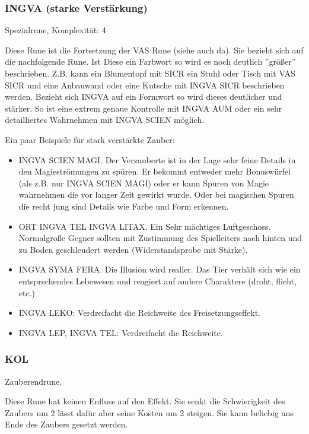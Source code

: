 \documentclass{article}
\begin{document}
\subsubsection{INGVA (starke Verstärkung)}

Spezialrune, Komplexität: 4

Diese Rune ist die Fortsetzung der VAS Rune (siehe auch da). Sie bezieht sich auf die nachfolgende Rune. Ist Diese
ein Farbwort so wird es noch deutlich ''größer'' beschrieben. Z.B. kann ein Blumentopf mit SICR ein Stuhl oder Tisch
mit VAS SICR und eine Anbauwand oder eine Kutsche mit INGVA SICR beschrieben werden. Bezieht sich INGVA auf ein
Formwort so wird dieses deutlicher und stärker. So ist eine extrem genaue Kontrolle mit INGVA AUM oder ein sehr
detailliertes Wahrnehmen mit INGVA SCIEN möglich.

Ein paar Beispiele für stark verstärkte Zauber:

\begin{itemize}
\item INGVA SCIEN MAGI. Der Verzauberte ist in der Lage sehr feine Details in den Magieströmungen zu spüren. Er bekommt entweder mehr Bonuswürfel (als z.B. nur INGVA SCIEN MAGI) oder er kann Spuren von Magie wahrnehmen die vor langer Zeit gewirkt wurde. Oder bei magischen Spuren die recht jung sind Details wie Farbe und Form erkennen.
\item ORT INGVA TEL INGVA LITAX. Ein Sehr mächtiges Luftgeschoss. Normalgroße Gegner sollten mit Zustimmung des Spielleiters nach hinten und zu Boden geschleudert werden (Widerstandsprobe mit Stärke).
\item INGVA SYMA FERA. Die Illusion wird realler. Das Tier verhält sich wie ein entsprechendes Lebewesen und reagiert auf andere Charaktere (droht, flieht, etc.)
\item INGVA LEKO: Verdreifacht die Reichweite des Freisetzungseffekt.
\item INGVA LEP, INGVA TEL: Verdreifacht die Reichweite.
\end{itemize}

\subsubsection{KOL}

Zauberendrune.

Diese Rune hat keinen Enfluss auf den Effekt. Sie senkt die Schwierigkeit des Zaubers um 2 lässt dafür aber seine
Kosten um 2 steigen. Sie kann beliebig ans Ende des Zaubers gesetzt werden.
\end{document}

